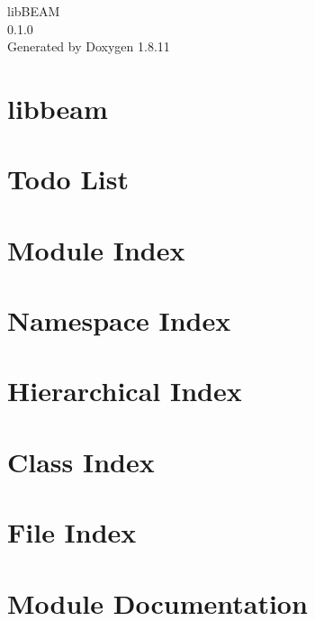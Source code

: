 \documentclass[twoside]{book}
\newcommand{\+}{\discretionary{\mbox{\scriptsize$\hookleftarrow$}}{}{}}
\newcommand{\clearemptydoublepage}{%
  \newpage{\pagestyle{empty}\cleardoublepage}%
}
\begin{document}
\hypersetup{pageanchor=false,
             bookmarksnumbered=true,
             pdfencoding=unicode
            }
\begin{titlepage}
\vspace*{7cm}
\begin{center}%
{\Large lib\+B\+E\+AM \\[1ex]\large 0.\+1.\+0 }\\
\vspace*{1cm}
{\large Generated by Doxygen 1.8.11}\\
\end{center}
\end{titlepage}
\clearemptydoublepage
\tableofcontents
\clearemptydoublepage
{}
\hypersetup{pageanchor=true}

\chapter{libbeam}
\label{md_README}
\hypertarget{md_README}{}

\chapter{Todo List}
\label{todo}
\hypertarget{todo}{}

\chapter{Module Index}

\chapter{Namespace Index}

\chapter{Hierarchical Index}

\chapter{Class Index}

\chapter{File Index}

\chapter{Module Documentation}




\end{document}
